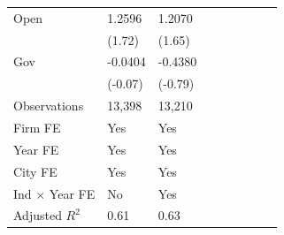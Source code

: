 \begin{table}[htbp]
\begin{tabularx}{\textwidth}{lYYYYYYYY@{}}
Open            &   1.2596\sym{*}  &   1.2070\sym{*}  \\
                &   (1.72)         &   (1.65)         \\
Gov             &  -0.0404         &  -0.4380         \\
                &  (-0.07)         &  (-0.79)         \\
\hline
Observations    &   13,398         &   13,210         \\
Firm FE         &      Yes         &      Yes         \\
Year FE         &      Yes         &      Yes         \\
City FE         &      Yes         &      Yes         \\
Ind $\times$ Year FE&       No         &      Yes         \\
Adjusted $ R^2$ &     0.61         &     0.63         \\
\bottomrule
\end{tabularx}
\end{table}

